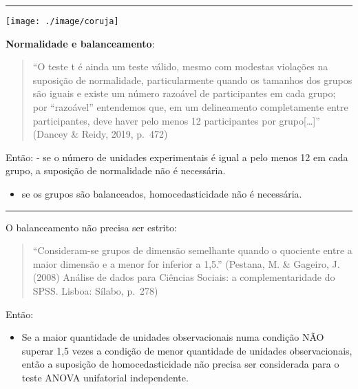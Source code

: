 \documentclass[]{article}
\providecommand{\tightlist}{%
  \setlength{\itemsep}{0pt}\setlength{\parskip}{0pt}}
\begin{document}
\begin{center}\rule{0.5\linewidth}{\linethickness}\end{center}

\begin{flushleft}\texttt{[image: ./image/coruja]} \end{flushleft}

\textbf{Normalidade e balanceamento}:

\begin{quote}
``O teste t é ainda um teste válido, mesmo com modestas violações na
suposição de normalidade, particularmente quando os tamanhos dos grupos
são iguais e existe um número razoável de participantes em cada grupo;
por ``razoável'' entendemos que, em um delineamento completamente entre
participantes, deve haver pelo menos 12 participantes por
grupo{[}\ldots{}{]}'' (Dancey \& Reidy, 2019, p.~472)
\end{quote}

Então: - se o número de unidades experimentais é igual a pelo menos 12
em cada grupo, a suposição de normalidade não é necessária.

\begin{itemize}
\tightlist
\item
  se os grupos são balanceados, homocedasticidade não é necessária.
\end{itemize}

\begin{center}\rule{0.5\linewidth}{\linethickness}\end{center}

O balanceamento não precisa ser estrito:

\begin{quote}
``Consideram-se grupos de dimensão semelhante quando o quociente entre a
maior dimensão e a menor for inferior a 1,5.'' (Pestana, M. \& Gageiro,
J. (2008) Análise de dados para Ciências Sociais: a complementaridade do
SPSS. Lisboa: Sílabo, p.~278)
\end{quote}

Então:

\begin{itemize}
\tightlist
\item
  Se a maior quantidade de unidades observacionais numa condição NÃO
  superar 1,5 vezes a condição de menor quantidade de unidades
  observacionais, então a suposição de homocedasticidade não precisa ser
  considerada para o teste ANOVA unifatorial independente.
\end{itemize}
\end{document}
